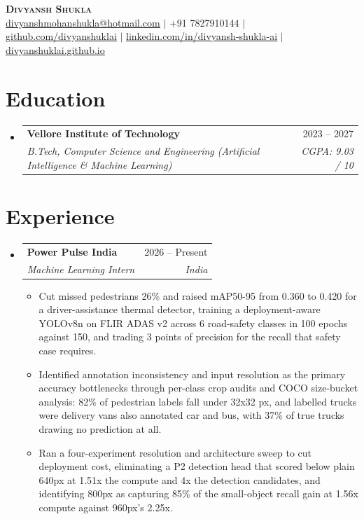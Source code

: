 \documentclass[letterpaper,11pt]{article}
\makeatletter
\newcommand{\graddate}{2023 -- 2027}
\newcommand{\introle}{Machine Learning Intern}
\newcommand{\intdates}{2026 -- Present}
\newcommand{\resumeItem}[1]{
  \item\small{#1}
}
\newcommand{\resumeSubheading}[4]{
  \vspace{-2pt}\item
    \begin{tabular*}{0.97\textwidth}[t]{l@{\extracolsep{\fill}}r}
      \textbf{#1} & #2 \\
      \textit{\small#3} & \textit{\small #4} \\
    \end{tabular*}\vspace{-8pt}
}
\newcommand{\resumeSubHeadingListStart}{\begin{itemize}[leftmargin=0.15in, label={}, itemsep=0pt]}
\newcommand{\resumeSubHeadingListEnd}{\end{itemize}\vspace{-11pt}}
\newcommand{\resumeItemListStart}{\begin{itemize}[itemsep=2pt, parsep=0pt, topsep=0pt]}
\newcommand{\resumeItemListEnd}{\end{itemize}\vspace{-6pt}}
\makeatother
\begin{document}
\begin{center}
    \textbf{\Huge \scshape Divyansh Shukla} \\ \vspace{2pt}
    \scriptsize
    \href{mailto:divyanshmohanshukla@hotmail.com}{\uline{divyanshmohanshukla@hotmail.com}} $|$
    +91 7827910144 $|$
    \href{https://github.com/divyanshuklai}{\uline{github.com/divyanshuklai}} $|$
    \href{https://www.linkedin.com/in/divyansh-shukla-ai/}{\uline{linkedin.com/in/divyansh-shukla-ai}} $|$
    \href{https://divyanshuklai.github.io}{\uline{divyanshuklai.github.io}}
\end{center}

\section{Education}
  \resumeSubHeadingListStart
    \resumeSubheading
      {Vellore Institute of Technology}{\graddate}
      {B.Tech, Computer Science and Engineering (Artificial Intelligence \& Machine Learning)}{CGPA: 9.03 / 10}
  \resumeSubHeadingListEnd

\section{Experience}
  \resumeSubHeadingListStart
    \resumeSubheading
      {Power Pulse India}{\intdates}
      {\introle}{India}
      \resumeItemListStart
        \resumeItem{Cut missed pedestrians 26\% and raised mAP50-95 from 0.360 to 0.420 for a driver-assistance thermal detector, training a deployment-aware YOLOv8n on FLIR ADAS v2 across 6 road-safety classes in 100 epochs against 150, and trading 3 points of precision for the recall that safety case requires.}
        \resumeItem{Identified annotation inconsistency and input resolution as the primary accuracy bottlenecks through per-class crop audits and COCO size-bucket analysis: 82\% of pedestrian labels fall under 32x32 px, and labelled trucks were delivery vans also annotated car and bus, with 37\% of true trucks drawing no prediction at all.}
        \resumeItem{Ran a four-experiment resolution and architecture sweep to cut deployment cost, eliminating a P2 detection head that scored below plain 640px at 1.51x the compute and 4x the detection candidates, and identifying 800px as capturing 85\% of the small-object recall gain at 1.56x compute against 960px's 2.25x.}
      \resumeItemListEnd
  \resumeSubHeadingListEnd
\end{document}
